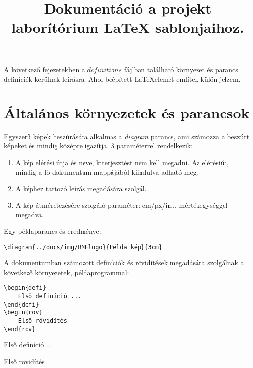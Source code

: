 \documentclass[]{article}
\title{Dokumentáció a projekt laborítórium \LaTeX$ $ sablonjaihoz. }
\begin{document}
\maketitle


\clearpage
A következő fejezetekben a $definitions$ fájlban található környezet és parancs definíciók kerülnek leírásra. Ahol beépített \LaTeX elemet említek külön jelzem.  

\section{Általános környezetek és parancsok}

Egyszerű képek beszúrására alkalmas a \textit{diagram} parancs, ami számozza a beszúrt képeket és mindig középre igazítja. 3 paraméterrel rendelkezik: 
\begin{enumerate}
	\item A kép elérési útja és neve, kiterjesztést nem kell megadni. Az elérésiút, mindig a fő dokumentum mappájából kiindulva adható meg.
	\item A képhez tartozó leírás megadására szolgál.
	\item A kép átméretezésére szolgáló paraméter: cm/px/in... mértékegységgel megadva.
\end{enumerate} 
Egy példaparancs és eredménye:
\begin{lstlisting}
\diagram{../docs/img/BMElogo}{Példa kép}{3cm}
\end{lstlisting}

A dokumentumban számozott definíciók és rövidítések megadására szolgálnak a következő környezetek, példaprogrammal:
\begin{lstlisting}
\begin{defi}
    Első definíció ...
\end{defi}
\begin{rov}
    Első rövidítés
\end{rov}
\end{lstlisting}
\begin{defi}
	Első definíció ...
\end{defi}
\begin{rov}
	Első rövidítés
\end{rov}
\end{document}
